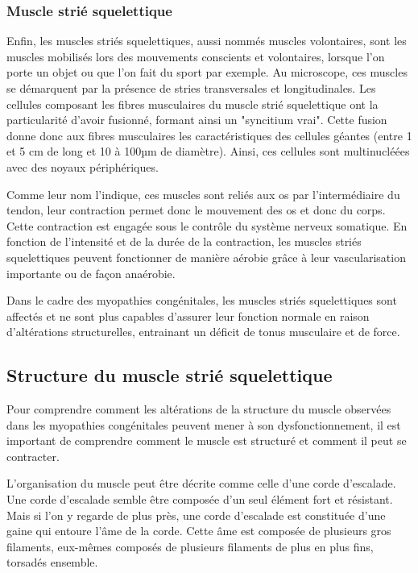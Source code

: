 \subsubsection{Muscle strié squelettique}
Enfin, les muscles striés squelettiques, aussi nommés muscles volontaires, sont les muscles mobilisés lors des mouvements conscients et volontaires, lorsque l'on porte un objet ou que l'on fait du sport par exemple. Au microscope, ces muscles se démarquent par la présence de stries transversales et longitudinales. Les cellules composant les fibres musculaires du muscle strié squelettique ont la particularité d'avoir fusionné, formant ainsi un "syncitium vrai". Cette fusion donne donc aux fibres musculaires les caractéristiques des cellules géantes (entre 1 et 5 cm de long et 10 à 100µm de diamètre). Ainsi, ces cellules sont multinucléées avec des noyaux périphériques.

Comme leur nom l'indique, ces muscles sont reliés aux os par l'intermédiaire du tendon, leur contraction permet donc le mouvement des os et donc du corps. Cette contraction est engagée sous le contrôle du système nerveux somatique. En fonction de l'intensité et de la durée de la contraction, les muscles striés squelettiques peuvent fonctionner de manière aérobie grâce à leur vascularisation importante ou de façon anaérobie.

Dans le cadre des myopathies congénitales, les muscles striés squelettiques sont affectés et ne sont plus capables d'assurer leur fonction normale en raison d'altérations structurelles, entrainant un déficit de tonus musculaire et de force.

\subsection{Structure du muscle strié squelettique}\label{muscle_struc}
Pour comprendre comment les altérations de la structure du muscle observées dans les myopathies congénitales peuvent mener à son dysfonctionnement, il est important de comprendre comment le muscle est structuré et comment il peut se contracter.

L'organisation du muscle peut être décrite comme celle d'une corde d'escalade. Une corde d'escalade semble être composée d'un seul élément fort et résistant. Mais si l'on y regarde de plus près, une corde d'escalade est constituée d'une gaine qui entoure l'âme de la corde. Cette âme est composée de plusieurs gros filaments, eux-mêmes composés de plusieurs filaments de plus en plus fins, torsadés ensemble. 

